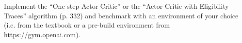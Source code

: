 
\begin{exercise}

\phantom{}

Implement the ``One-step Actor-Critic'' or the ``Actor-Critic with Eligibility Traces''
algorithm (p. 332) and benchmark with an environment of your choice
(i.e. from the textbook or a pre-build environment from https://gym.openai.com).

\end{exercise}


\begin{solution}

\phantom{}

\end{solution}

